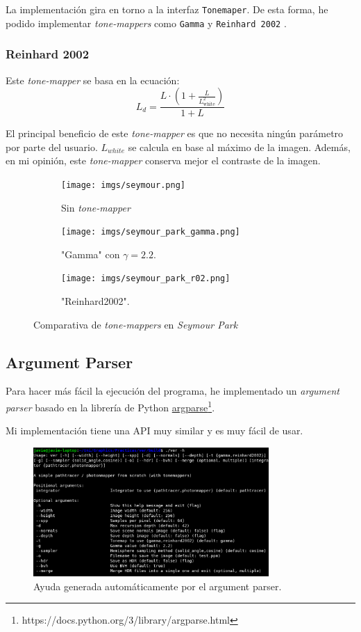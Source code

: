 \documentclass{article}
\begin{document}
La implementación gira en torno a la interfaz \texttt{Tonemaper}. De esta forma,
he podido implementar \textit{tone-mappers} como \texttt{Gamma} y \texttt{Reinhard
  2002} \cite{Reinhard2002}.

\subsubsection{Reinhard 2002}
Este \textit{tone-mapper} se basa en la ecuación:
\begin{equation}
  L_d = \frac{L \cdot (1 + \frac{L}{L_{\text{white}}^2})}{1 + L}
\end{equation}

El principal beneficio de este \textit{tone-mapper} es que no necesita ningún
parámetro por parte del usuario. \(L_{white}\) se calcula en base al máximo de la
imagen. Además, en mi opinión, este \textit{tone-mapper} conserva mejor el contraste
de la imagen.

\begin{figure}[H]
  \begin{subfigure}[h]{0.32\linewidth}
    \texttt{[image: imgs/seymour.png]}
    \caption{Sin \textit{tone-mapper}}
  \end{subfigure}
  \hfill
  \begin{subfigure}[h]{0.32\linewidth}
    \texttt{[image: imgs/seymour\_park\_gamma.png]}
    \caption{"Gamma" con \(\gamma=2.2\).}
  \end{subfigure}
  \hfill
  \begin{subfigure}[h]{0.32\linewidth}
    \texttt{[image: imgs/seymour\_park\_r02.png]}
    \caption{"Reinhard2002".}
  \end{subfigure}
  \caption{Comparativa de \textit{tone-mappers} en \textit{Seymour Park}}
\end{figure}

\subsection{Argument Parser}
Para hacer más fácil la ejecución del programa, he implementado un \textit{argument
parser} basado en la librería de Python
\href{https://docs.python.org/3/library/argparse.html}{argparse}\footnote{https://docs.python.org/3/library/argparse.html}.

Mi implementación tiene una API muy similar y es muy fácil de usar.

\begin{figure}[h]
  \centering \includegraphics[width=0.8\textwidth]{imgs/args.png}
  \caption{Ayuda generada automáticamente por el argument parser.}
\end{figure}
\end{document}

